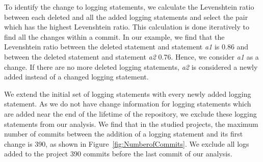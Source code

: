 






To identify the change to logging statements, we calculate the Levenshtein ratio between each deleted and all the added logging statements and select the pair which has the highest Levenshtein ratio. This calculation is done iteratively to find all the changes within a commit. In our example, we find that the Levenshtein ratio between the deleted statement and statement \emph{a1} is 0.86 and between the deleted statement and statement \emph{a2} 0.76. Hence, we consider \emph{a1} as a change. If there are no more deleted logging statements, \emph{a2} is considered a newly added instead of a changed logging statement. 

We extend the initial set of logging statements with every newly added logging statement. 
As we do not have change information for logging statements which are added near the end of the lifetime of the repository, we exclude these logging statements from our analysis. We find that in the studied projects, the maximum number of commits between the addition of a logging statement and its first change is 390, as shown in Figure~\ref{fig:NumberofCommits}. We exclude all logs added to the project 390 commits before the last commit of our analysis. 



